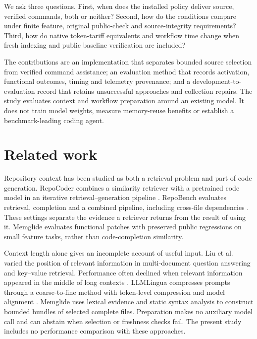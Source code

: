 \documentclass[manuscript,screen,nonacm]{acmart}
\begin{document}
We ask three questions. First, when does the installed policy deliver
source, verified commands, both or neither? Second, how do the
conditions compare under finite feature, original public-check and
source-integrity requirements? Third, how do native token-tariff
equivalents and workflow time change when fresh indexing and public
baseline verification are included?

The contributions are an implementation that separates bounded source
selection from verified command assistance; an evaluation method that
records activation, functional outcomes, timing and telemetry
provenance; and a development-to- evaluation record that retains
unsuccessful approaches and collection repairs. The study evaluates
context and workflow preparation around an existing model. It does not
train model weights, measure memory-reuse benefits or establish a
benchmark-leading coding agent.

\section{Related work}\label{related-work}

Repository context has been studied as both a retrieval problem and part
of code generation. RepoCoder combines a similarity retriever with a
pretrained code model in an iterative retrieval--generation pipeline
\citep{zhang-etal-2023-repocoder}. RepoBench evaluates retrieval,
completion and a combined pipeline, including cross-file dependencies
\citep{liu2023repobench}. These settings separate the evidence a
retriever returns from the result of using it. Memglide evaluates
functional patches with preserved public regressions on small feature
tasks, rather than code-completion similarity.

Context length alone gives an incomplete account of useful input. Liu et
al. varied the position of relevant information in multi-document
question answering and key--value retrieval. Performance often declined
when relevant information appeared in the middle of long contexts
\citep{liu-etal-2024-lost}. LLMLingua compresses prompts through a
coarse-to-fine method with token-level compression and model alignment
\citep{jiang-etal-2023-llmlingua}. Memglide uses lexical evidence and
static syntax analysis to construct bounded bundles of selected complete
files. Preparation makes no auxiliary model call and can abstain when
selection or freshness checks fail. The present study includes no
performance comparison with these approaches.
\end{document}
